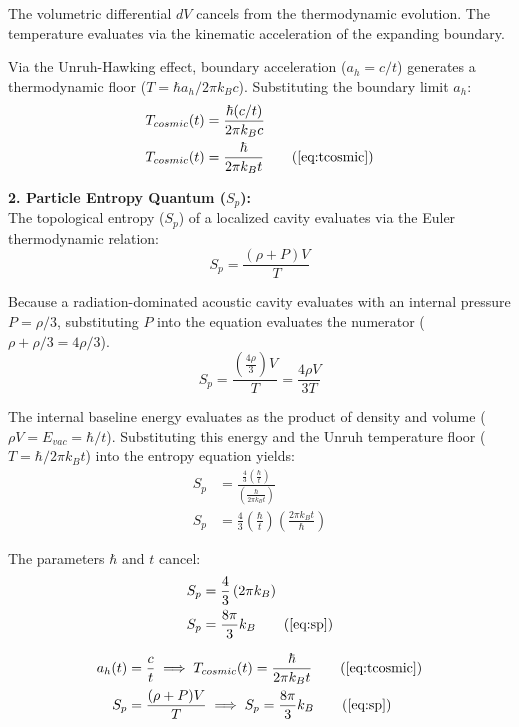The volumetric differential $dV$ cancels from the thermodynamic evolution. The temperature evaluates via the kinematic acceleration of the expanding boundary. 

Via the Unruh-Hawking effect, boundary acceleration ($a_h = c/t$) generates a thermodynamic floor ($T = \hbar a_h / 2\pi k_B c$). Substituting the boundary limit $a_h$: 
\begin{align}
    T_{cosmic}(t) &= \frac{\hbar (c/t)}{2\pi k_B c}  \\
    T_{cosmic}(t) &= \frac{\hbar}{2\pi k_B t} \tag{\ref{eq:tcosmic}}
\end{align}

\textbf{2. Particle Entropy Quantum ($S_p$):} \\
The topological entropy ($S_p$) of a localized cavity evaluates via the Euler thermodynamic relation: 
\begin{equation}
    S_p = \frac{(\rho + P)V}{T} 
\end{equation}

Because a radiation-dominated acoustic cavity evaluates with an internal pressure $P = \rho/3$, substituting $P$ into the equation evaluates the numerator ($\rho + \rho/3 = 4\rho/3$). 
\begin{equation}
    S_p = \frac{\left(\frac{4\rho}{3}\right)V}{T} = \frac{4 \rho V}{3 T} 
\end{equation}

The internal baseline energy evaluates as the product of density and volume ($\rho V = E_{vac} = \hbar/t$). Substituting this energy and the Unruh temperature floor ($T = \hbar / 2\pi k_B t$) into the entropy equation yields: 
\begin{align}
    S_p &= \frac{\frac{4}{3} \left(\frac{\hbar}{t}\right)}{\left(\frac{\hbar}{2\pi k_B t}\right)}  \\
    S_p &= \frac{4}{3} \left( \frac{\hbar}{t} \right) \left( \frac{2\pi k_B t}{\hbar} \right) 
\end{align}

The parameters $\hbar$ and $t$ cancel: 
\begin{align}
    S_p &= \frac{4}{3} \left( 2\pi k_B \right)  \\
    S_p &= \frac{8\pi}{3} k_B \tag{\ref{eq:sp}}
\end{align}

\begin{tcolorbox}[recallbox, title={\ref{box:thermo_vacuum}. Thermodynamic Vacuum \& Entropy}]
\begin{align}
    a_h(t) &= \frac{c}{t} \implies T_{cosmic}(t) = \frac{\hbar}{2\pi k_B t} \tag{\ref{eq:tcosmic}} \\ 
    S_p &= \frac{(\rho + P)V}{T} \implies S_p = \frac{8\pi}{3} k_B \tag{\ref{eq:sp}}
\end{align}
\end{tcolorbox}



